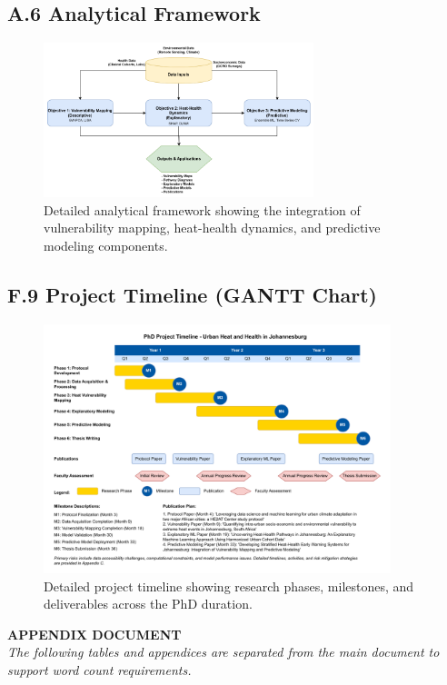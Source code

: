 \documentclass[12pt,a4paper,landscape]{article}
\begin{document}
\subsection*{A.6 Analytical Framework}
\begin{figure}[H]
    \centering
    \includegraphics[width=0.7\textwidth]{images/AnalyticalFW.png}
    \caption{Detailed analytical framework showing the integration of vulnerability mapping, heat-health dynamics, and predictive modeling components.}
    \label{fig:analytical}
\end{figure}

\subsection*{F.9 Project Timeline (GANTT Chart)}
\begin{figure}[H]
    \centering
    \includegraphics[width=0.9\textwidth]{images/GNT2.drawio.pdf}
    \caption{Detailed project timeline showing research phases, milestones, and deliverables across the PhD duration.}
    \label{fig:gantt}
\end{figure}

\begin{center}
    \Large\textbf{APPENDIX DOCUMENT}\\[0.5em]
    \normalsize\textit{The following tables and appendices are separated from the main document to support word count requirements.}
\end{center}
\end{document}

